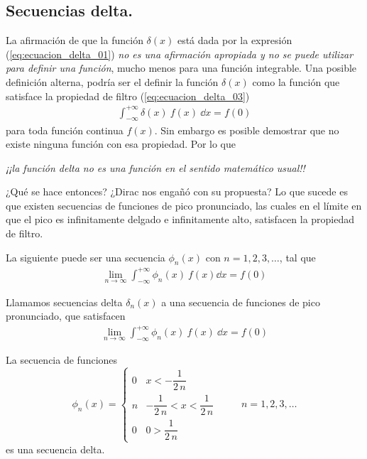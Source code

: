\documentclass[12pt]{beamer}
\begin{document}
\subsection{Secuencias delta.}\label{secuencias_delta}
La afirmación de que la función $\delta (x)$ está dada por la expresión (\ref{eq:ecuacion_delta_01}) \textit{no es una afirmación apropiada y no se puede utilizar para definir una función}, mucho menos para una función integrable. Una posible definición alterna, podría ser el definir la función $\delta (x)$ como la función que satisface la propiedad de filtro (\ref{eq:ecuacion_delta_03})
\begin{align*}
\int_{-\infty}^{+ \infty} \delta (x) \: f(x) \: \dd{x} = f(0)
\end{align*}
para toda función continua $f(x)$. Sin embargo es posible demostrar que no existe ninguna función con esa propiedad. Por lo que 
\begin{center}
\textit{¡¡la función delta no es una función en el sentido matemático usual!!}
\end{center}
¿Qué se hace entonces?  ¿Dirac nos engañó con su propuesta? Lo que sucede es que existen secuencias de funciones de pico pronunciado, las cuales en el límite en que el pico es infinitamente delgado e infinitamente alto, satisfacen la propiedad de filtro.
\par
La siguiente puede ser una secuencia $\phi_{n} (x)$ con $n = 1, 2, 3, \ldots$, tal que
\begin{align*}
\lim_{n \to \infty} \int_{-\infty}^{+ \infty} \phi_{n}(x) \: f(x) \dd{x} =  f(0)
\end{align*}
\begin{defi}
Llamamos secuencias delta $\delta_{n} (x)$ a una secuencia de funciones de pico pronunciado, que satisfacen
\begin{align*}
\lim_{n \to \infty} \int_{-\infty}^{+ \infty} \phi_{n} (x) \: f(x) \: \dd{x} =  f(0)
\end{align*}
\end{defi}
\begin{ejemplo}
La secuencia de funciones
\begin{equation}
\phi_{n} (x) = \begin{cases}
0 & x < - \dfrac{1}{2 \, n} \\
n & - \dfrac{1}{2 \, n} < x < \dfrac{1}{2 \, n} \\
0 & 0 >  \dfrac{1}{2 \, n}
\end{cases}
\hspace{1cm} n = 1, 2, 3, \ldots
\label{eq:ecuacion_delta_04}
\end{equation}
es una secuencia delta.
\end{ejemplo}
\end{document}
